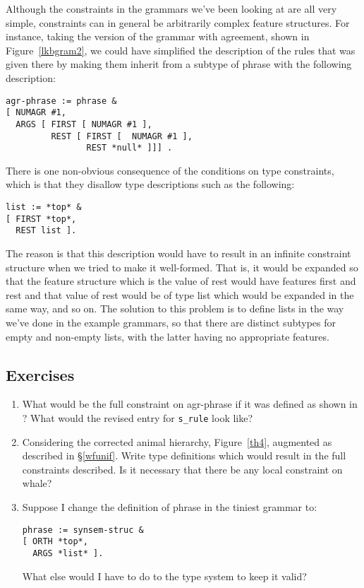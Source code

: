 \documentclass[12pt]{report}
\begin{document}
Although the constraints in the grammars we've been
looking at are all very
simple, constraints can in general be
arbitrarily complex feature structures.  
For instance,
taking the version of the grammar with agreement, shown in 
Figure~\ref{lkbgram2},
we could have simplified the description of the rules
that was given there by making them inherit from a subtype of {\type phrase}
with the following description:
\begin{ex}
\begin{verbatim}
agr-phrase := phrase &
[ NUMAGR #1,
  ARGS [ FIRST [ NUMAGR #1 ],
         REST [ FIRST [  NUMAGR #1 ],
                REST *null* ]]] .
\end{verbatim}
\end{ex}

There is one non-obvious consequence of the conditions on
type constraints, which is that they disallow type
descriptions such as the following:
\begin{ex}
\begin{verbatim}
list := *top* &
[ FIRST *top*,
  REST list ].
\end{verbatim}
\end{ex}
The reason is that this description would have to
result in an infinite constraint structure
when we tried to make it well-formed.  That is, it would be expanded so
that the feature structure which is the value of {\feature rest} 
would have
features {\feature first} and {\feature rest} and that value of 
{\feature rest} would be
of type {\type list} which would be expanded in the same way, and so on.
The solution to this problem is to define lists in the way
we've done in the example grammars, so that there are distinct
subtypes for empty and non-empty lists, with the latter having
no appropriate features.

\subsection{Exercises}
\begin{enumerate}
\item What would be the full constraint on {\type agr-phrase}
if it was defined as shown in ?
What would the revised entry for {\tt s\_rule} look like?
\item Considering the corrected animal hierarchy, Figure~\ref{th4},
augmented as described in \S\ref{wfunif}.  Write type
definitions which would result in the full constraints
described.  Is it necessary that there be any local constraint on
{\type whale}?
\item Suppose I change the definition of {\type phrase} in the
tiniest grammar to:
\begin{verbatim}
phrase := synsem-struc &
[ ORTH *top*,
  ARGS *list* ].
\end{verbatim}
What else would I have to do to the type system
to keep it valid?
\end{enumerate}
\end{document}
